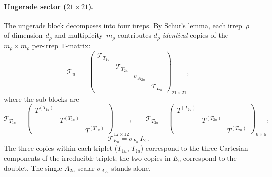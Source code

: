 \paragraph{Ungerade sector ($21 \times 21$).}
The ungerade block decomposes into four irreps.  By Schur's lemma,
each irrep~$\rho$ of dimension~$d_\rho$ and multiplicity~$m_\rho$
contributes $d_\rho$ \emph{identical} copies of the $m_\rho \times
m_\rho$ per-irrep T-matrix:
\begin{equation}
  \mathcal{T}_u
  \;=\;
  \begin{pmatrix}
    \mathcal{T}_{T_{1u}} & & & \\
    & \mathcal{T}_{T_{2u}} & & \\
    & & \sigma_{A_{2u}} & \\
    & & & \mathcal{T}_{E_u}
  \end{pmatrix}_{\!21\times 21},
  \label{eq:Tu-block}
\end{equation}
where the sub-blocks are
\begin{equation}
  \mathcal{T}_{T_{1u}}
  =
  \begin{pmatrix}
    T^{(T_{1u})} & & \\
    & T^{(T_{1u})} & \\
    & & T^{(T_{1u})}
  \end{pmatrix}_{\!12\times 12}
  \!\!\!,\qquad
  \mathcal{T}_{T_{2u}}
  =
  \begin{pmatrix}
    T^{(T_{2u})} & & \\
    & T^{(T_{2u})} & \\
    & & T^{(T_{2u})}
  \end{pmatrix}_{\!6\times 6}
  \!\!\!,
  \label{eq:Tu-subblocks}
\end{equation}
\begin{equation}
  \mathcal{T}_{E_u}
  = \sigma_{E_u}\,I_2\,.
  \label{eq:TEu-scalar}
\end{equation}
The three copies within each triplet ($T_{1u}$, $T_{2u}$) correspond
to the three Cartesian components of the irreducible triplet; the two
copies in $E_u$ correspond to the doublet.  The single $A_{2u}$ scalar
$\sigma_{A_{2u}}$ stands alone.

